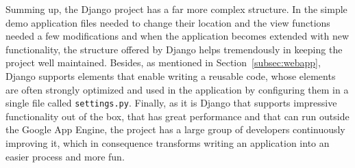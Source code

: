 Summing up, the Django project has a far more complex structure. In the simple demo application files needed to change their location and the view functions needed a few modifications and when the application becomes extended with new functionality, the structure offered by Django helps tremendously in keeping the project well maintained. Besides, as mentioned in Section~\ref{subsec:webapp}, Django supports elements that enable writing a reusable code, whose elements are often strongly optimized and used in the application by configuring them in a single file called \texttt{settings.py}. Finally, as it is Django that supports impressive functionality out of the box, that has great performance and that can run outside the Google App Engine, the project has a large group of developers continuously improving it, which in consequence transforms writing an application into an easier process and more fun. 